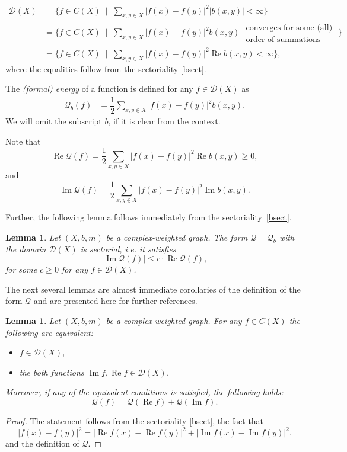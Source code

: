 \documentclass[a4paper,11pt]{amsart}
\newtheorem{lemma}[theorem]{Lemma}
\theoremstyle{definition}
\renewcommand{\Re}{\operatorname{Re}}%
\renewcommand{\Im}{\operatorname{Im}}%
\newcommand{\abs}[1]{\left|#1\right|}%
\newcommand{\D}{\mathcal{D}}
\newcommand{\Q}{\mathcal{Q}}
\begin{document}
\begin{align*}
\mathcal D(X)&=\Big\{f\in C(X)\;\mid\;\sum_{x,y\in X}\abs{f(x)-f(y)}^2 |b(x,y)|<\infty\Big\}\\
&=\Big\{f\in C(X)\;\mid\; \sum_{x,y\in X}\abs{f(x)-f(y)}^2 b(x,y)\substack{ \mbox{ converges for some (all) }\\\mbox{ order of summations}}\Big\}\\
&=\Big\{f\in C(X)\;\mid\;\sum_{x,y \in X}\abs{f(x)-f(y)}^2 \Re b(x,y) <\infty\Big\},
\end{align*}
where the equalities follow from the sectoriality \eqref{bsect}.





The {\em (formal) energy} of a function is defined for any $f\in \mathcal D(X)$ as 
\begin{align*}
\mathcal Q_b(f)&=\dfrac12 \sum_{x,y\in X}\abs{f(x)-f(y)}^2b(x,y).
\end{align*}
We will omit the subscript $b$, if it is clear from the context.



Note that 
\begin{equation*}%
\Re \mathcal Q(f)=\dfrac12 \sum_{x,y\in X}\abs{f(x)-f(y)}^2\Re b(x,y)\ge 0,
\end{equation*}
and
$$
\Im \mathcal Q(f)=\dfrac12 \sum_{x,y\in X}\abs{f(x)-f(y)}^2\Im b(x,y).
$$

Further,  the following lemma follows immediately from the sectoriality~\eqref{bsect}.
\begin{lemma}\label{lem::formalQmapstosector}
Let $(X,b,m)$ be a complex-weighted graph. The  form $\mathcal Q=\mathcal Q_b$ with the domain $\D(X)$ is sectorial, i.e. it satisfies
$$
|\Im \mathcal Q(f)|\le  c \cdot\Re \mathcal Q(f),
$$
for some $c\ge0 $ for any $f\in \D(X)$.
\end{lemma}
The next several lemmas are almost immediate corollaries of the definition of the form $\Q$ and are presented here for further references.

\begin{lemma}\label{lem::complexf}
Let $(X,b,m)$ be a complex-weighted graph. For any $f\in C(X)$ the following are equivalent:
\begin{itemize}
\item
$f\in \D(X)$,
 \item
 the both  functions $\Im f, \Re f\in \D(X)$.

 \end{itemize} 
 Moreover, if  any of the equivalent conditions is satisfied, the following holds:
\begin{equation}\label{eq::QfQRefQImf}
\mathcal Q(f)=\mathcal Q(\Re f)+\mathcal Q(\Im f).
\end{equation}
\end{lemma}
\begin{proof}
The statement follows from the sectoriality \eqref{bsect}, the fact that
$$
|f(x)-f(y)|^2=|\Re f(x)-\Re f(y)|^2+|\Im f(x)-\Im f(y)|^2.
$$
and the definition of $\mathcal Q$.
\end{proof}
\end{document}
